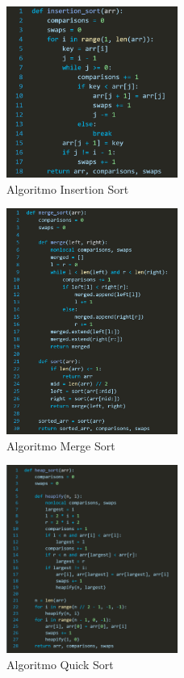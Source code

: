 \documentclass[tcc2]{uftex}
\begin{document}
\begin{figure}[h!]
    \centering
    \includegraphics[width=0.5\textwidth]{insertion_sort.png}  %
    \caption{Algoritmo Insertion Sort}
    \label{fig:exemplo}
\end{figure}

\begin{figure}[h!]
    \centering
    \includegraphics[width=0.5\textwidth]{merge_sort.png}  %
    \caption{Algoritmo Merge Sort}
    \label{fig:exemplo}
\end{figure}

\begin{figure}[h!]
    \centering
    \includegraphics[width=0.5\textwidth]{heap_sort.png}  %
    \caption{Algoritmo Quick Sort}
    \label{fig:exemplo}
\end{figure}
\end{document}
